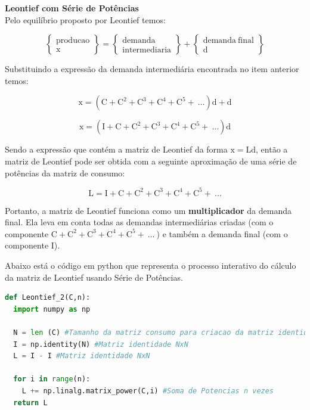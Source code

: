 \documentclass[a4paper, 12pt]{article}
\begin{document}
\textbf{Leontief com Série de Potências}\\

Pelo equilíbrio proposto por Leontief temos:

$$\begin{Bmatrix}
\mathrm{producao}\\
\mathrm{x}
\end{Bmatrix}=\begin{Bmatrix}
\mathrm{demanda}\\
\mathrm{intermediaria}
\end{Bmatrix}+\begin{Bmatrix}
\mathrm{demanda\ final}\\
\mathrm{d}
\end{Bmatrix}$$

Substituindo a expressão da demanda intermediária encontrada no item anterior temos:

$$\mathrm{x}=\left(\mathrm{C}+\mathrm{C^2}+\mathrm{C^3}+\mathrm{C^4}+\mathrm{C^5}+\ \dots \right)\mathrm{d}+\mathrm{d}$$

$$\mathrm{x}=\left(\mathrm{I}+\mathrm{C}+\mathrm{C^2}+\mathrm{C^3}+\mathrm{C^4}+\mathrm{C^5}+\ \dots \right)\mathrm{d}$$

Sendo a expressão que contém a matriz de Leontief da forma $\mathrm{x=Ld}$, então a matriz de Leontief pode ser obtida com a seguinte aproximação de uma série de potências da matriz de consumo:

$$\boxed{\ \mathrm{L}=\mathrm{I}+\mathrm{C}+\mathrm{C^2}+\mathrm{C^3}+\mathrm{C^4}+\mathrm{C^5}+\ \dots \ }$$

Portanto, a matriz de Leontief funciona como um \textbf{multiplicador} da demanda final. Ela leva em conta todas as demandas intermediárias criadas (com o componente $\mathrm{C}+\mathrm{C^2}+\mathrm{C^3}+\mathrm{C^4}+\mathrm{C^5}+\ \dots \ $) e também a demanda final (com o componente $\mathrm{I}$).

Abaixo está o código em python que representa o processo interativo do cálculo da matriz de Leontief usando Série de Potências.\\

\begin{lstlisting}[language=Python, caption=Função Matriz de Leontief por soma de potências, label=listing_MatrizLeotiefpot]
def Leontief_2(C,n):
  import numpy as np
  
  N = len (C) #Tamanho da matriz consumo para criacao da matriz identidade
  I = np.identity(N) #Matriz identidade NxN
  L = I - I #Matriz identidade NxN
  
  for i in range(n):
    L += np.linalg.matrix_power(C,i) #Soma de Potencias n vezes
  return L
\end{lstlisting}\\
\end{document}
